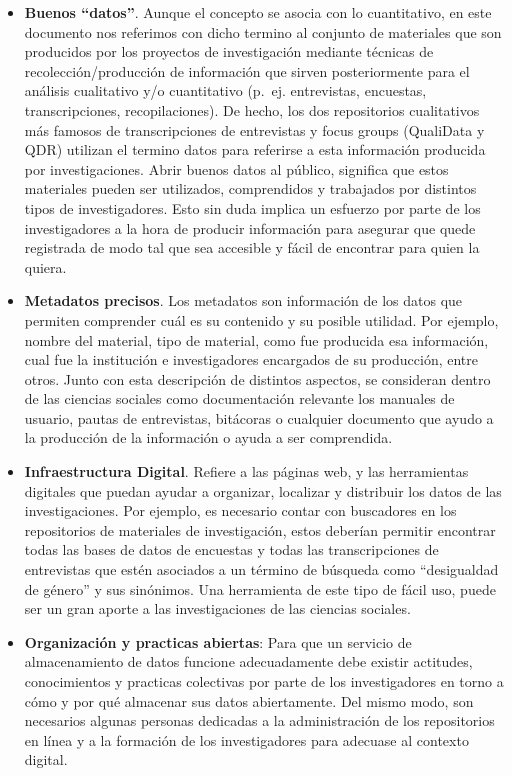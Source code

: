\documentclass[
  14pt,
]{book}
\begin{document}
\begin{itemize}
\item
  \textbf{Buenos ``datos''}. Aunque el concepto se asocia con lo cuantitativo, en este documento nos referimos con dicho termino al conjunto de materiales que son producidos por los proyectos de investigación mediante técnicas de recolección/producción de información que sirven posteriormente para el análisis cualitativo y/o cuantitativo (p.~ej. entrevistas, encuestas, transcripciones, recopilaciones). De hecho, los dos repositorios cualitativos más famosos de transcripciones de entrevistas y focus groups (QualiData y QDR) utilizan el termino datos para referirse a esta información producida por investigaciones. Abrir buenos datos al público, significa que estos materiales pueden ser utilizados, comprendidos y trabajados por distintos tipos de investigadores. Esto sin duda implica un esfuerzo por parte de los investigadores a la hora de producir información para asegurar que quede registrada de modo tal que sea accesible y fácil de encontrar para quien la quiera.
\item
  \textbf{Metadatos precisos}. Los metadatos son información de los datos que permiten comprender cuál es su contenido y su posible utilidad. Por ejemplo, nombre del material, tipo de material, como fue producida esa información, cual fue la institución e investigadores encargados de su producción, entre otros. Junto con esta descripción de distintos aspectos, se consideran dentro de las ciencias sociales como documentación relevante los manuales de usuario, pautas de entrevistas, bitácoras o cualquier documento que ayudo a la producción de la información o ayuda a ser comprendida.
\item
  \textbf{Infraestructura Digital}. Refiere a las páginas web, y las herramientas digitales que puedan ayudar a organizar, localizar y distribuir los datos de las investigaciones. Por ejemplo, es necesario contar con buscadores en los repositorios de materiales de investigación, estos deberían permitir encontrar todas las bases de datos de encuestas y todas las transcripciones de entrevistas que estén asociados a un término de búsqueda como ``desigualdad de género'' y sus sinónimos. Una herramienta de este tipo de fácil uso, puede ser un gran aporte a las investigaciones de las ciencias sociales.
\item
  \textbf{Organización y practicas abiertas}: Para que un servicio de almacenamiento de datos funcione adecuadamente debe existir actitudes, conocimientos y practicas colectivas por parte de los investigadores en torno a cómo y por qué almacenar sus datos abiertamente. Del mismo modo, son necesarios algunas personas dedicadas a la administración de los repositorios en línea y a la formación de los investigadores para adecuase al contexto digital.
\end{itemize}
\end{document}
